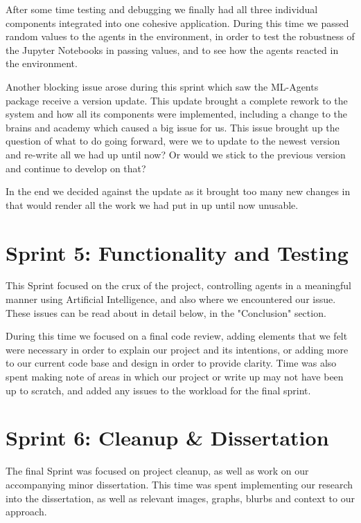 	After some time testing and debugging we finally had all three individual components integrated into one cohesive application. During this time we passed random values to the agents in the environment, in order to test the robustness of the Jupyter Notebooks in passing values, and to see how the agents reacted in the environment.
	
	Another blocking issue arose during this sprint which saw the ML-Agents package receive a version update. This update brought a complete rework to the system and how all its components were implemented, including a change to the brains and academy which caused a big issue for us. This issue brought up the question of what to do going forward, were we to update to the newest version and re-write all we had up until now? Or would we stick to the previous version and continue to develop on that? 
	
	In the end we decided against the update as it brought too many new changes in that would render all the work we had put in up until now unusable.
	

\section{Sprint 5: Functionality and Testing}
	
	This Sprint focused on the crux of the project, controlling agents in a meaningful manner using Artificial Intelligence, and also where we encountered our issue. These issues can be read about in detail below, in the "Conclusion" section. 
	
	During this time we focused on a final code review, adding elements that we felt were necessary in order to explain our project and its intentions, or adding more to our current code base and design in order to provide clarity.
	Time was also spent making note of areas in which our project or write up may not have been up to scratch, and added any issues to the workload for the final sprint.


\section{Sprint 6: Cleanup \& Dissertation} 

	The final Sprint was focused on project cleanup, as well as work on our accompanying minor dissertation. This time was spent implementing our research into the dissertation, as well as relevant images, graphs, blurbs and context to our approach.


